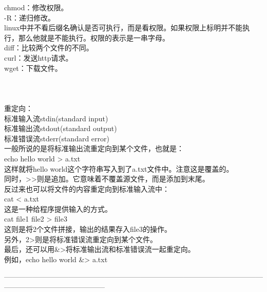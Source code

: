 \documentclass{article}
\begin{document}
\noindent
chmod：修改权限。\\
\hspace*{2em} -R：递归修改。\\
\hspace*{2em} linux中并不看后缀名确认是否可执行，而是看权限。如果权限上标明并不能执行，那么他就是不能执行。权限的表示是一串字母。\\
diff：比较两个文件的不同。\\

\noindent
curl：发送http请求。\\
wget：下载文件。\\
\\
\\
\\

\noindent
重定向：\\

\noindent
标准输入流stdin(standard input)\\
标准输出流stdout(standard output)\\
标准错误流stderr(standard error)\\

\noindent
一般所说的是将标准输出流重定向到某个文件，也就是：\\
echo hello world > a.txt\\
这样就将hello world这个字符串写入到了a.txt文件中。注意这是覆盖的。\\
同时，>>则是追加。它意味着不覆盖源文件，而是添加到末尾。\\

\noindent
反过来也可以将文件的内容重定向到标准输入流中：\\
cat < a.txt\\
这是一种给程序提供输入的方式。\\
cat file1 file2 > file3\\
这则是将2个文件拼接，输出的结果存入file3的操作。\\

\noindent
另外，2>则是将标准错误流重定向到某个文件。\\

\noindent
最后，还可以用\&>将标准输出流和标准错误流一起重定向。\\
例如，echo hello world \&> a.txt\\

\begin{center}
    ——————————————————————————————————————————————————\\
\end{center}
\end{document}
